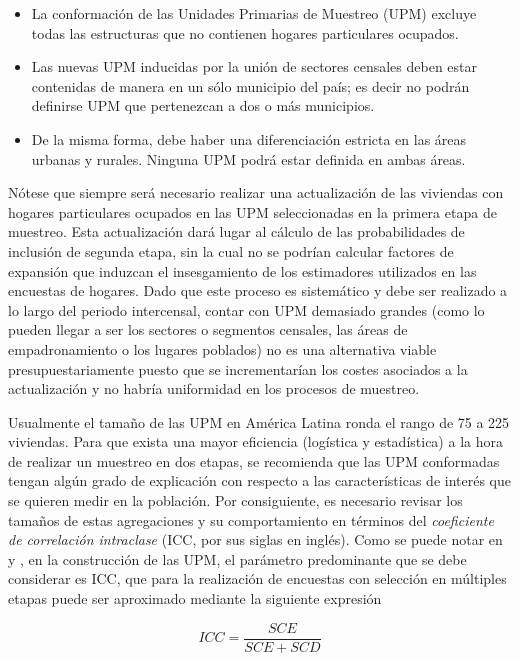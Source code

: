 \documentclass[
  12pt,
]{book}
\providecommand{\tightlist}{%
  \setlength{\itemsep}{0pt}\setlength{\parskip}{0pt}}
\begin{document}
\begin{itemize}
\tightlist
\item
  La conformación de las Unidades Primarias de Muestreo (UPM) excluye todas las estructuras que no contienen hogares particulares ocupados.
\item
  Las nuevas UPM inducidas por la unión de sectores censales deben estar contenidas de manera en un sólo municipio del país; es decir no podrán definirse UPM que pertenezcan a dos o más municipios.
\item
  De la misma forma, debe haber una diferenciación estricta en las áreas urbanas y rurales. Ninguna UPM podrá estar definida en ambas áreas.
\end{itemize}

Nótese que siempre será necesario realizar una actualización de las viviendas con hogares particulares ocupados en las UPM seleccionadas en la primera etapa de muestreo. Esta actualización dará lugar al cálculo de las probabilidades de inclusión de segunda etapa, sin la cual no se podrían calcular factores de expansión que induzcan el insesgamiento de los estimadores utilizados en las encuestas de hogares. Dado que este proceso es sistemático y debe ser realizado a lo largo del periodo intercensal, contar con UPM demasiado grandes (como lo pueden llegar a ser los sectores o segmentos censales, las áreas de empadronamiento o los lugares poblados) no es una alternativa viable presupuestariamente puesto que se incrementarían los costes asociados a la actualización y no habría uniformidad en los procesos de muestreo.

Usualmente el tamaño de las UPM en América Latina ronda el rango de 75 a 225 viviendas. Para que exista una mayor eficiencia (logística y estadística) a la hora de realizar un muestreo en dos etapas, se recomienda que las UPM conformadas tengan algún grado de explicación con respecto a las características de interés que se quieren medir en la población. Por consiguiente, es necesario revisar los tamaños de estas agregaciones y su comportamiento en términos del \emph{coeficiente de correlación intraclase} (ICC, por sus siglas en inglés). Como se puede notar en \citet{Cochran_1977} y \citet{Gutierrez_2016}, en la construcción de las UPM, el parámetro predominante que se debe considerar es ICC, que para la realización de encuestas con selección en múltiples etapas puede ser aproximado mediante la siguiente expresión \citep{Valliant_Dever_Kreuter_2013}

\[
ICC = \frac{SCE}{SCE+SCD}
\]
\end{document}
